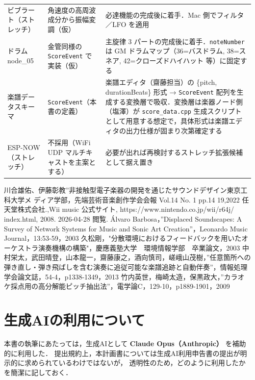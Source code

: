 \documentclass[lualatex,book,paper=a4paper,jafontsize=11.5pt,jafontscale=1.05]{jlreq}
\begin{document}
\begin{longtable}{L{0.18\textwidth} L{0.34\textwidth} L{0.40\textwidth}}
ビブラート（ストレッチ）  & 角速度の高周波成分から振幅変調（仮）       & 必達機能の完成後に着手．Mac 側でフィルタ／LFO を適用 \\
ドラム node\_05         & 金管同様の \texttt{ScoreEvent} で実装（仮） & 主旋律 3 パートの完成後に着手．\texttt{noteNumber} は GM ドラムマップ（36=バスドラム, 38=スネア, 42=クローズドハイハット 等）に固定する \\
楽譜データスキーマ       & \texttt{ScoreEvent}（本書の定義）          & 楽譜エディタ（齋藤担当）の \{pitch, durationBeats\} 形式 → \texttt{ScoreEvent} 配列を生成する変換層で吸収．変換層は楽器ノード側（塩澤）が \texttt{score\_data.cpp} 生成スクリプトとして用意する想定で，具体形式は楽譜エディタの出力仕様が固まり次第確定する \\
ESP-NOW（ストレッチ）    & 不採用（WiFi UDP マルチキャストを主案とする） & 必要が出れば再検討するストレッチ拡張候補として据え置き \\
\bottomrule
\end{longtable}


\begin{thebibliography}{30}
川合雄佑、伊藤彰教”非接触型電子楽器の開発を通じたサウンドデザイン東京工科大学メ
ディア学部，先端芸術音楽創作学会会報 Vol.14 No. 1 pp.14 19,2022
任天堂株式会社.,Wii music 公式サイト, https://www.nintendo.co.jp/wii/r64j/
index.html, 2008. 2026-04-28 閲覧.
 Álvaro Barbosa，”Displaced Soundscapes: A Survey of Network Systems for Music and Sonic Art Creation”，Leonardo Music Journal，13:53-59，2003
  久松剛，"分散環境におけるフィードバックを用いたオーケストラ演奏機構の構築"，慶應義塾大学　環境情報学部　卒業論文，2003
  中村栄太，武田晴登，山本龍一，齋藤康之，酒向慎司，嵯峨山茂樹，”任意箇所への弾き直し・弾き飛ばしを含む演奏に追従可能な楽譜追跡と自動伴奏”，情報処理学会論文誌，54-4，p1338-1349，2013
  竹内英世，梅崎太造，保黒政大，”カラオケ採点用の高分解能ピッチ抽出法”，電学論C，129-10，p1889-1901，2009
\end{thebibliography}



\chapter{生成AIの利用について}\label{chap:ai-usage}

本書の執筆にあたっては，生成AIとして \textbf{Claude Opus（Anthropic）} を補助的に利用した．
提出規約上，本計画書については生成AI利用申告書の提出が明示的に求められているわけではないが，
透明性のため，どのように利用したかを簡潔に記しておく．
\end{document}
